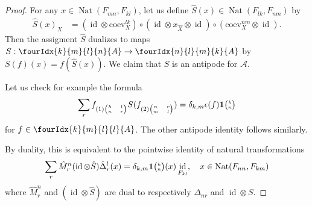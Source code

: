 \documentclass[10pt]{article}
\DeclareMathOperator{\id}{id}
\DeclareMathOperator{\Nat}{\mathrm{Nat}}
\newcommand{\n}{\mathfrak{n}}
\newcommand{\ev}{\mathrm{ev}}
\newcommand{\coev}{\mathrm{coev}}
\newcommand{\Grt}[3]{#1{\tiny{\begin{pmatrix} #2\\#3\end{pmatrix}}}}
\newcommand{\UnitC}[2]{\Grt{\mathbf{1}}{#1}{#2}}
\newcommand{\Gr}[5]{\fourIdx{#2}{#4}{#3}{#5}{#1}}%
\theoremstyle{definition}
\numberwithin{equation}{section}
\begin{document}
\begin{proof} 
  For any $x\in \Nat(F_{mn},F_{kl})$, let us define $\hat{S}(x) \in
  \Nat(F_{lk},F_{nm})$ by
\begin{align*}
  \hat{S}(x)_X &= %
(\id \otimes \coev^{lk}_{X}) \circ (\id \otimes x_{\hat X}
  \otimes \id) \circ (\coev^{nm}_{X} \otimes \id).
\end{align*}
Then the assigment $\hat{S}$ dualizes to maps $S:\Gr{A}{k}{l}{m}{n} \rightarrow \Gr{A}{n}{m}{l}{k}$ by $S(f)(x) = f(\hat{S}(x))$. We claim that $S$ is an antipode for $\mathscr{A}$. 

Let us check for example the formula \[\sum_r f_{(1){\tiny \begin{pmatrix}k&l\\n & r\end{pmatrix}}} S(f_{(2){\tiny \begin{pmatrix} n & r \\ m & l\end{pmatrix}}}) = \delta_{k,m}\epsilon(f)\UnitC{k}{n}\] for $f\in \Gr{A}{k}{l}{m}{l}$. The other antipode identity follows similarly.

By duality, this is equivalent to the pointwise identity of natural transformations \[\sum_r\hat{M}^n_r(\id\otimes \hat{S})\hat{\Delta}^l_r(x) = \delta_{k,m}\UnitC{k}{n}(x) \id_{F_{kl}},\quad x\in \Nat(F_{nn},F_{km})\] where $\hat{M}^n_r$ and $(\id\otimes \hat{S})$ are dual to respectively $\Delta_{nr}$ and $\id\otimes S$. 


\end{proof}
\end{document}
